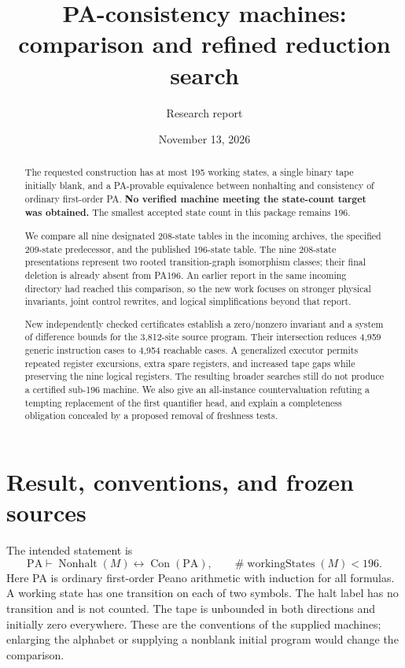 \documentclass[11pt,letterpaper]{article}
\title{PA-consistency machines:\\comparison and refined reduction search}
\author{Research report}
\date{November 13, 2026}
\newcommand{\PA}{\mathrm{PA}}
\newcommand{\Con}{\operatorname{Con}}
\newcommand{\NH}{\operatorname{Nonhalt}}
\begin{document}
\maketitle
\begin{abstract}
The requested construction has at most 195 working states, a single
binary tape initially blank, and a PA-provable equivalence between
nonhalting and consistency of ordinary first-order PA.
\textbf{No verified machine meeting the state-count target was obtained.}
The smallest accepted state count in this package remains 196.

We compare all nine designated 208-state tables in the incoming archives,
the specified 209-state predecessor, and the published 196-state table.
The nine 208-state presentations represent two rooted transition-graph
isomorphism classes; their final deletion is already absent from PA196.
An earlier report in the same incoming directory had reached this
comparison, so the new work focuses on stronger physical invariants,
joint control rewrites, and logical simplifications beyond that report.

New independently checked certificates establish a zero/nonzero invariant
and a system of difference bounds for the 3,812-site source program.
Their intersection reduces 4,959 generic instruction cases to 4,954
reachable cases. A generalized executor permits repeated register
excursions, extra spare registers, and increased tape gaps while
preserving the nine logical registers. The resulting broader searches
still do not produce a certified sub-196 machine. We also give an
all-instance countervaluation refuting a tempting replacement of the
first quantifier head, and explain a completeness obligation concealed
by a proposed removal of freshness tests.
\end{abstract}
\setcounter{tocdepth}{1}
\tableofcontents
\clearpage

\section{Result, conventions, and frozen sources}
\label{sec:result}

The intended statement is
\begin{equation}\label{eq:target}
  \PA\vdash\NH(M)\longleftrightarrow\Con(\PA),
  \qquad \#\operatorname{workingStates}(M)<196.
\end{equation}
Here PA is ordinary first-order Peano arithmetic with induction for all
formulas. A working state has one transition on each of two symbols.
The halt label has no transition and is not counted. The tape is
unbounded in both directions and initially zero everywhere. These are
the conventions of the supplied machines; enlarging the alphabet or
supplying a nonblank initial program would change the comparison.
\end{document}
